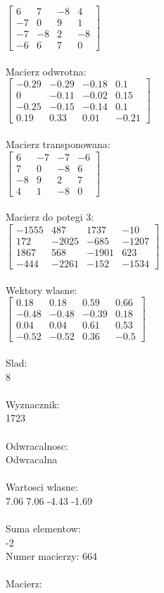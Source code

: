 \documentclass[a4paper,12pt]{article}
\begin{document}
$\begin{bmatrix} 6&7&-8&4\\-7&0&9&1\\-7&-8&2&-8\\-6&6&7&0 \end{bmatrix}$
\\
\\
Macierz odwrotna:\\

$\begin{bmatrix} -0.29&-0.29&-0.18&0.1\\0&-0.11&-0.02&0.15\\-0.25&-0.15&-0.14&0.1\\0.19&0.33&0.01&-0.21 \end{bmatrix}$
\\
\\
Macierz transponowana:\\

$\begin{bmatrix} 6&-7&-7&-6\\7&0&-8&6\\-8&9&2&7\\4&1&-8&0 \end{bmatrix}$
\\
\\
Macierz do potegi 3:\\

$\begin{bmatrix} -1555&487&1737&-10\\172&-2025&-685&-1207\\1867&568&-1901&623\\-444&-2261&-152&-1534 \end{bmatrix}$
\\
\\
Wektory wlasne:\\

$\begin{bmatrix} 0.18&0.18&0.59&0.66\\-0.48&-0.48&-0.39&0.18\\0.04&0.04&0.61&0.53\\-0.52&-0.52&0.36&-0.5 \end{bmatrix}$
\\
\\
Slad:\\
8
\\
\\
Wyznacznik:\\
1723
\\
\\
Odwracalnosc:\\
Odwracalna
\\
\\
Wartosci wlasne:\\
7.06 7.06 -4.43 -1.69
\\
\\
Suma elementow:\\
-2
\\
\newpage
Numer macierzy:
664
\\
\\
Macierz:\\
\end{document}
